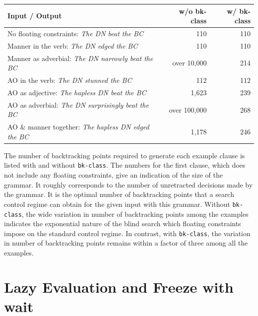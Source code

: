 \documentclass[10pt,a4paper]{report}
\begin{document}
\begin{center}
  \begin{tabular}{ | p{12cm} | r | r |}
	\hline
	Input / Output & w/o bk-class & w/ bk-class \\ 
    \hline \hline

	\parbox[t]{10cm}{
		No floating constraints:
		{\em The DN beat the BC}} & 110 & 110 \\ \hline

	\parbox[t]{10cm}{
		Manner in the verb:
		{\em The DN edged the BC}} & 110 & 110 \\ \hline

	\parbox[t]{10cm}{
		Manner as adverbial:
		{\em The DN narrowly beat the BC}} & over 10,000 & 214 \\ \hline

	\parbox[t]{10cm}{
		AO in the verb:
		{\em The DN stunned the BC}} & 112 & 112  \\ \hline

	\parbox[t]{10cm}{
		AO as adjective:
		{\em The hapless DN beat the BC}} & 1,623 & 239 \\ \hline

	\parbox[t]{10cm}{
		AO as adverbial:
		{\em The DN surprisingly beat the BC}} & over 100,000 & 268 \\ \hline

	\parbox[t]{10cm}{
		AO \& manner together:
		{\em The hapless DN edged the BC}} & 1,178 & 246 \\ \hline
    \hline
  \end{tabular}
\end{center}

The number of backtracking points required to generate each example clause
is listed with and without {\tt bk-class}.  The numbers for the first clause,
which does not include any floating constraints, give an indication of the
size of the grammar.  It roughly corresponds to the number of unretracted
decisions made by the grammar.  It is the optimal number of backtracking
points that a search control regime can obtain for the given input with
this grammar.  Without {\tt bk-class}, the wide variation in number of
backtracking points among the examples indicates the exponential nature of
the blind search which floating constraints impose on the standard control
regime.  In contrast, with {\tt bk-class}, the variation in number of
backtracking points remains within a factor of three among all the
examples.  



\section{Lazy Evaluation and Freeze with wait}
\end{document}
